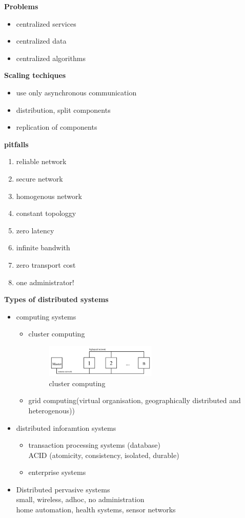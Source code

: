 \documentclass[ngerman,a4paper]{report}
\begin{document}
\textbf{Problems}

\begin{itemize}
\item centralized services
\item centralized data
\item centralized algorithms
\end{itemize}

\textbf{Scaling techiques}

\begin{itemize}
\item use only asynchronous communication
\item distribution, split components
\item replication of components
\end{itemize}

\textbf{pitfalls}

\begin{enumerate}
\item reliable network
\item secure network
\item homogenous network
\item constant topologgy
\item zero latency
\item infinite bandwith
\item zero transport cost
\item one administrator!
\end{enumerate}

\textbf{Types of distributed systems}
\begin{itemize}
\item computing systems
\begin{itemize}
\item cluster computing
\begin{figure}
	\centering
	\includegraphics[width=200px]{gfx/cluster_computing.png}
	\caption{cluster computing}
	\label{img:cluster_comp}
\end{figure}
\item grid computing(virtual organisation, geographically distributed and heterogenous))
\end{itemize}
\item distributed inforamtion systems
\begin{itemize}
\item transaction processing systems (database) \\
ACID (atomicity, consistency, isolated, durable)
\item enterprise systems
\end{itemize}
\item Distributed pervasive systems\\
small, wireless, adhoc, no administration\\
home automation, health systems, sensor networks
\end{itemize}
\end{document}
